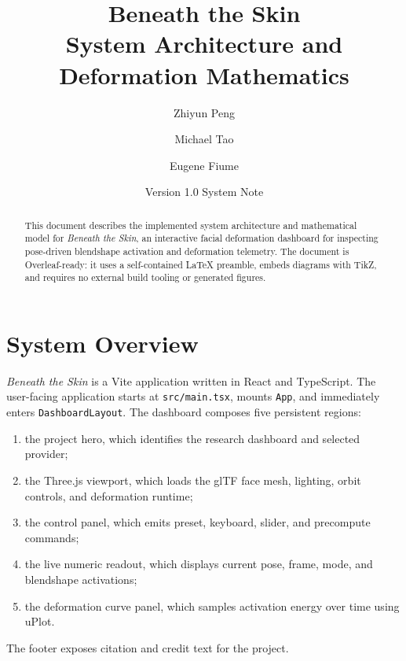 \documentclass[11pt]{article}
\title{\textbf{Beneath the Skin}\\System Architecture and Deformation Mathematics}
\author{Zhiyun Peng \and Michael Tao \and Eugene Fiume}
\date{Version 1.0 System Note}
\newcommand{\code}[1]{\texttt{#1}}
\begin{document}
\maketitle

\begin{abstract}
This document describes the implemented system architecture and mathematical model for \emph{Beneath the Skin}, an interactive facial deformation dashboard for inspecting pose-driven blendshape activation and deformation telemetry.  The document is Overleaf-ready: it uses a self-contained LaTeX preamble, embeds diagrams with TikZ, and requires no external build tooling or generated figures.
\end{abstract}

\tableofcontents
\newpage

\section{System Overview}

\emph{Beneath the Skin} is a Vite application written in React and TypeScript.  The user-facing application starts at \code{src/main.tsx}, mounts \code{App}, and immediately enters \code{DashboardLayout}.  The dashboard composes five persistent regions:
\begin{enumerate}[leftmargin=*]
  \item the project hero, which identifies the research dashboard and selected provider;
  \item the Three.js viewport, which loads the glTF face mesh, lighting, orbit controls, and deformation runtime;
  \item the control panel, which emits preset, keyboard, slider, and precompute commands;
  \item the live numeric readout, which displays current pose, frame, mode, and blendshape activations;
  \item the deformation curve panel, which samples activation energy over time using uPlot.
\end{enumerate}
The footer exposes citation and credit text for the project.
\end{document}
